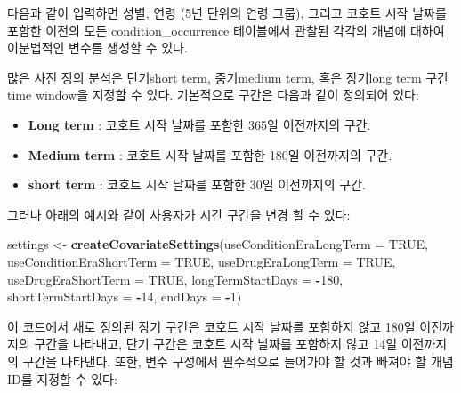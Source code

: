 \documentclass[10.5pt]{book}
\newenvironment{Shaded}{\begin{snugshade}}{\end{snugshade}}
\newcommand{\KeywordTok}[1]{\textcolor[rgb]{0.13,0.29,0.53}{\textbf{#1}}}
\newcommand{\DataTypeTok}[1]{\textcolor[rgb]{0.13,0.29,0.53}{#1}}
\newcommand{\DecValTok}[1]{\textcolor[rgb]{0.00,0.00,0.81}{#1}}
\newcommand{\StringTok}[1]{\textcolor[rgb]{0.31,0.60,0.02}{#1}}
\newcommand{\OtherTok}[1]{\textcolor[rgb]{0.56,0.35,0.01}{#1}}
\newcommand{\OperatorTok}[1]{\textcolor[rgb]{0.81,0.36,0.00}{\textbf{#1}}}
\newcommand{\NormalTok}[1]{#1}
\providecommand{\tightlist}{%
  \setlength{\itemsep}{0pt}\setlength{\parskip}{0pt}}
\theoremstyle{definition}
\theoremstyle{definition}
\theoremstyle{definition}
\theoremstyle{remark}
\begin{document}
다음과 같이 입력하면 성별, 연령 (5년 단위의 연령 그룹), 그리고 코호트
시작 날짜를 포함한 이전의 모든 condition\_occurrence 테이블에서 관찰된
각각의 개념에 대하여 이분법적인 변수를 생성할 수 있다.

많은 사전 정의 분석은 단기short term, 중기medium term, 혹은 장기long
term 구간time window을 지정할 수 있다. 기본적으로 구간은 다음과 같이
정의되어 있다:

\begin{itemize}
\tightlist
\item
  \textbf{Long term} : 코호트 시작 날짜를 포함한 365일 이전까지의 구간.
\item
  \textbf{Medium term} : 코호트 시작 날짜를 포함한 180일 이전까지의
  구간.
\item
  \textbf{short term} : 코호트 시작 날짜를 포함한 30일 이전까지의 구간.
\end{itemize}

그러나 아래의 예시와 같이 사용자가 시간 구간을 변경 할 수 있다:

\begin{Shaded}
\begin{Highlighting}[]
\NormalTok{settings <-}\StringTok{ }\KeywordTok{createCovariateSettings}\NormalTok{(}\DataTypeTok{useConditionEraLongTerm =} \OtherTok{TRUE}\NormalTok{, }
                                    \DataTypeTok{useConditionEraShortTerm =} \OtherTok{TRUE}\NormalTok{, }
                                    \DataTypeTok{useDrugEraLongTerm =} \OtherTok{TRUE}\NormalTok{,}
                                    \DataTypeTok{useDrugEraShortTerm =} \OtherTok{TRUE}\NormalTok{, }
                                    \DataTypeTok{longTermStartDays =} \OperatorTok{-}\DecValTok{180}\NormalTok{, }
                                    \DataTypeTok{shortTermStartDays =} \OperatorTok{-}\DecValTok{14}\NormalTok{, }
                                    \DataTypeTok{endDays =} \OperatorTok{-}\DecValTok{1}\NormalTok{) }
\end{Highlighting}
\end{Shaded}

이 코드에서 새로 정의된 장기 구간은 코호트 시작 날짜를 포함하지 않고
180일 이전까지의 구간을 나타내고, 단기 구간은 코호트 시작 날짜를
포함하지 않고 14일 이전까지의 구간을 나타낸다. 또한, 변수 구성에서
필수적으로 들어가야 할 것과 빠져야 할 개념 ID를 지정할 수 있다:
\end{document}

